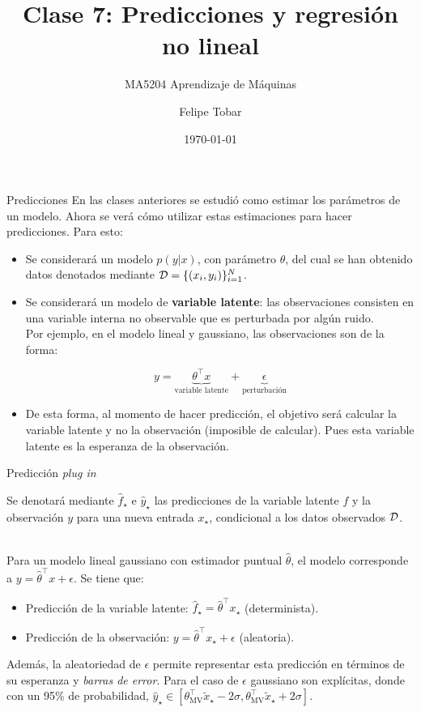 \documentclass[9pt, handout]{beamer}
\title{Clase 7: Predicciones y regresión no lineal}
\subtitle{MA5204 Aprendizaje de Máquinas}\date{\today}
\author{Felipe Tobar}
\institute{Department of Mathematical Engineering \&\\ Center for Mathematical Modelling\\Universidad de Chile}
\begin{document}
\begin{frame}
  \titlepage
\end{frame}

\begin{frame}{Predicciones}
	En las clases anteriores se estudió como estimar los parámetros de un modelo. Ahora se verá cómo utilizar estas estimaciones para hacer predicciones. Para esto:
	
	\begin{itemize}
		\item Se considerará un modelo $p(y|x)$, con parámetro $\theta$, del cual se han obtenido datos denotados mediante ${\mathcal D} = \{(x_i,y_i)\}_{i=1}^N$.\pause
		\item Se considerará un modelo de \textbf{variable latente}: las observaciones consisten en una variable interna no observable que es perturbada por algún ruido. \\
		Por ejemplo, en el modelo lineal y gaussiano, las observaciones son de la forma:

			\begin{equation*}
				y= \underbrace{\theta^\top x}_{\text{variable latente}} + \underbrace{\epsilon}_{\text{perturbación}}
			\end{equation*}\pause
		\item De esta forma, al momento de hacer predicción, el objetivo será calcular la variable latente y no la observación (imposible de calcular). Pues esta variable latente es la esperanza de la observación.
	\end{itemize}
	
\end{frame}

\begin{frame}{Predicción \emph{plug in}}

Se denotará mediante $\hat f_\star$ e $\hat y_\star$ las predicciones de la variable latente $f$ y la observación $y$ para una nueva entrada $x_\star$, condicional a los datos observados ${\mathcal D}$.\\~\ \pause

Para un modelo lineal gaussiano con estimador puntual $\hat{\theta}$, el modelo corresponde a $y=\hat{\theta}^\top x + \epsilon$. \pause Se tiene que:

\begin{itemize}
	\item Predicción de la variable latente: $\hat f_\star=\hat{\theta}^\top x_\star$ (determinista).\pause
	\item Predicción de la observación: $y=\hat{\theta}^\top x_\star + \epsilon$ (aleatoria).\pause
\end{itemize}
\vspace{1em}
Además, la aleatoriedad de $\epsilon$ permite representar esta predicción en términos de su esperanza y \emph{barras de error}. Para el caso de $\epsilon$ gaussiano son explícitas, donde con un 95\% de probabilidad, $\hat y_\star\in[\theta_{\text{MV}}^\top \tilde{x}_\star - 2\sigma,\theta_{\text{MV}}^\top \tilde{x}_\star + 2\sigma]$.
	
\end{frame}
\end{document}
